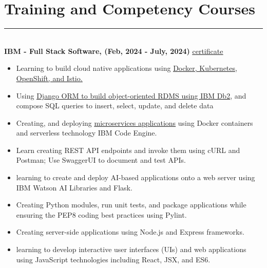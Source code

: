 \documentclass[12pt]{article}
\begin{document}
\vspace{-5mm}\section*{\fontsize{14}{1}\selectfont\color{color_29791}Training and Competency Courses}\vspace{-9pt} 
\rule{\textwidth}{0.4pt}
\vspace{2pt}
\\\textbf{IBM - Full Stack Software, (Feb, 2024 - July, 2024)} \hspace{72mm} \href{https://coursera.org/share/a352ad6b5eef1f6443a48a21e561add4}{\underline{certificate}}
\vspace{-3mm}
\begin{itemize}
  \item Learning to build cloud native applications using \href{https://coursera.org/share/5705b6b914c0600090105451c32dd8d0}{\underline{Docker, Kubernetes, OpenShift, and Istio.}}
  \vspace{-3mm}
  \item Using \href{https://coursera.org/share/069696f4c4cbb78e2c12acb663c4a1ee}{\underline{Django ORM to build object-oriented RDMS using IBM Db2}}, and compose SQL queries to insert, select, update, and delete data
  \vspace{-3mm}
  \item Creating, and deploying \href{https://coursera.org/share/dea435400069b14cf6579a09dce472ac}{\underline{microservices applications}} using Docker containers and serverless technology IBM Code Engine.
  \vspace{-3mm}
  \item Learn creating REST API endpoints and invoke them using cURL and Postman; Use SwaggerUI to document and test APIs.
   \vspace{-3mm}
  \item learning to create and deploy AI-based applications onto a web server using IBM Watson AI Libraries and Flask.
  \vspace{-3mm}
  \item Creating Python modules, run unit tests, and package applications while ensuring the PEP8 coding best practices using Pylint.
  \vspace{-3mm}
  \item Creating server-side applications using Node.js and Express frameworks.
  \vspace{-3mm}
  \item learning to develop interactive user interfaces (UIs) and web applications using JavaScript technologies including React, JSX, and ES6.
\end{itemize}
\end{document}
